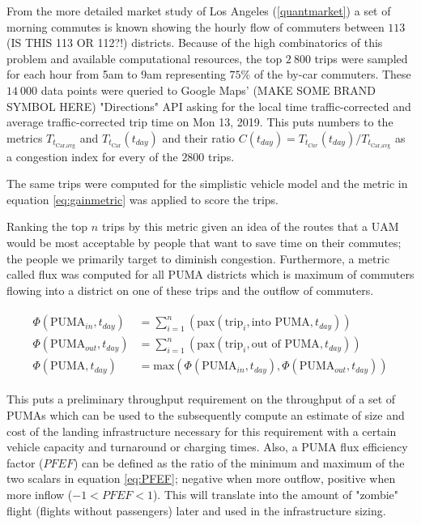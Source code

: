 From the more detailed market study of Los Angeles (\autoref{quantmarket}) a set of morning commutes is known showing the hourly flow of commuters between $113$ (IS THIS 113 OR 112?!) districts. Because of the high combinatorics of this problem and available computational resources, the top $2\ 800$ trips were sampled for each hour from 5am to 9am representing $75\%$ of the by-car commuters. These $14\ 000$ data points were queried to Google Maps' (MAKE SOME BRAND SYMBOL HERE) "Directions" API asking for the local time traffic-corrected and average traffic-corrected trip time on Mon 13, 2019. This puts numbers to the metrics $T_{t_{\text{Car},\text{avg} }}$ and $T_{t_{\text{Car} }}(t_{day})$ and their ratio $C(t_{day}) = T_{t_{Car}}(t_{day}) / T_{t_{\text{Car},\text{avg}} }$ as a congestion index for every of the $2800$ trips.

The same trips were computed for the simplistic vehicle model and the metric in equation \ref{eq:gainmetric} was applied to score the trips.

Ranking the top $n$ trips by this metric given an idea of the routes that a UAM would be most acceptable by people that want to save time on their commutes; the people we primarily target to diminish congestion. Furthermore, a metric called flux was computed for all PUMA districts which is maximum of commuters flowing into a district on one of these trips and the outflow of commuters.

\begin{align} \label{eq:PUMAflux}
    \begin{split}
    \Phi(\text{PUMA}_{in}, t_{day}) &= \sum_{i=1}^n{ \left( \text{pax}(\text{trip}_i, \text{into   PUMA}, t_{day})\right)}\\
    \Phi(\text{PUMA}_{out}, t_{day}) &= \sum_{i=1}^n{ \left( \text{pax}(\text{trip}_i, \text{out of PUMA}, t_{day})\right)}\\
    \Phi(\text{PUMA}, t_{day}) &= \text{max} 
    \left(
        \Phi(\text{PUMA}_{in}, t_{day}),
        \Phi(\text{PUMA}_{out}, t_{day})
    \right)
    \end{split}
\end{align}

This puts a preliminary throughput requirement on the throughput of a set of PUMAs which can be used to the subsequently compute an estimate of size and cost of the landing infrastructure necessary for this requirement with a certain vehicle capacity and turnaround or charging times. Also, a PUMA flux efficiency factor ($PFEF$) can be defined as the ratio of the minimum and maximum of the two scalars in equation \ref{eq:PFEF}; negative when more outflow, positive when more inflow ($-1 < PFEF < 1$). This will translate into the amount of "zombie" flight (flights without passengers) later and used in the infrastructure sizing.

